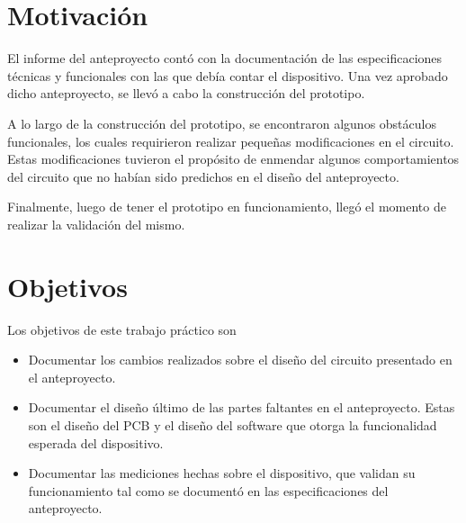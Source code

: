 
\section{Motivación}
\label{sec:motivacion}

	El informe del anteproyecto contó con la documentación de las especificaciones técnicas y funcionales con las que debía contar el dispositivo. Una vez aprobado dicho anteproyecto, se llevó a cabo la construcción del prototipo.
    
    A lo largo de la construcción del prototipo, se encontraron algunos obstáculos funcionales, los cuales requirieron realizar pequeñas modificaciones en el circuito. Estas modificaciones tuvieron el propósito de enmendar algunos comportamientos del circuito que no habían sido predichos en el diseño del anteproyecto.
    
    Finalmente, luego de tener el prototipo en funcionamiento, llegó el momento de realizar la validación del mismo.
    
\section{Objetivos}

	Los objetivos de este trabajo práctico son
    
\begin{itemize}
\item Documentar los cambios realizados sobre el diseño del circuito presentado en el anteproyecto.
\item Documentar el diseño último de las partes faltantes en el anteproyecto. Estas son el diseño del PCB y el diseño del software que otorga la funcionalidad esperada del dispositivo.
\item Documentar las mediciones hechas sobre el dispositivo, que validan su funcionamiento tal como se documentó en las especificaciones del anteproyecto. 
\end{itemize}

